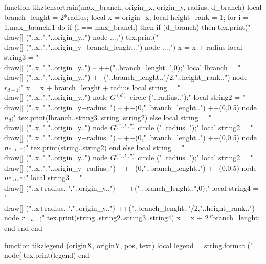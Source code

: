 \begin{luacode*}
    function tikztensortrain(max_branch, origin_x, origin_y, radius, d_branch)
      local branch_lenght = 2*radius;
      local x = origin_x;
      local height_rank = 1;
      for i = 1,max_branch,1 do
        if (i == max_branch) then
          if (d_branch) then
            tex.print("\\draw[] ("..x..","..origin_y..") node {...};")
            tex.print("\\draw[] ("..x..","..origin_y+branch_lenght..") node {...};")
            x = x + radius
            local string3 = "\\draw[] ("..x..","..origin_y..") -- ++("..branch_lenght..",0);"
            local lbranch = "\\draw[] ("..x..","..origin_y..") ++("..branch_lenght.."/2,"..height_rank..") node { $r_{d-1}$};"
            x = x + branch_lenght + radius
            local string = "\\draw[] ("..x..","..origin_y..") node {$G^{(d)}$} circle ("..radius..");"
            local string2 = "\\draw[] ("..x..","..origin_y+radius..") -- ++(0,"..branch_lenght..") ++(0,0.5) node {$n_{d}$};"
            tex.print(lbranch..string3..string..string2)
          else
            local string = "\\draw[] ("..x..","..origin_y..") node {$G^{("..i..")}$} circle ("..radius..");"
            local string2 = "\\draw[] ("..x..","..origin_y+radius..") -- ++(0,"..branch_lenght..") ++(0,0.5) node {$n_{"..i.."}$};"
            tex.print(string..string2)
          end
        else
          local string = "\\draw[] ("..x..","..origin_y..") node {$G^{("..i..")}$} circle ("..radius..");"
          local string2 = "\\draw[] ("..x..","..origin_y+radius..") -- ++(0,"..branch_lenght..") ++(0,0.5) node {$n_{"..i.."}$};"
          local string3 = "\\draw[] ("..x+radius..","..origin_y..") -- ++("..branch_lenght..",0);"
          local string4 = "\\draw[] ("..x+radius..","..origin_y..") ++("..branch_lenght.."/2,"..height_rank..") node { $r_{"..i.."}$};"
          tex.print(string..string2..string3..string4)
          x = x + 2*branch_lenght;
        end
      end
    end

  function tikzlegend (originX, originY, pos, text)
  local legend = string.format ("\\node[%
  tex.print(legend)
  end


\end{luacode*}
